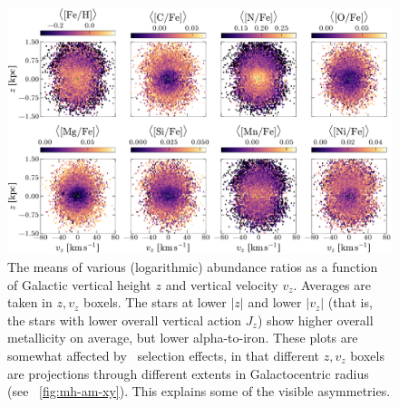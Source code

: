 \documentclass[modern]{aastex63}
\newcommand{\apogee}{\acronym{APOGEE}}
\begin{document}
\begin{figure}[!tp]
  \begin{mdframed}
  \color{captiongray}
  \begin{center}
  \includegraphics[width=\textwidth]{abundance-zvz-grid.pdf}
  \end{center}
  \caption{%
    The means of various (logarithmic) abundance ratios as a function of
    Galactic vertical height $z$ and vertical velocity $v_z$.
    Averages are taken in $z, v_z$ boxels.
    The stars at lower $|z|$ and lower $|v_z|$ (that is, the stars with
    lower overall vertical action $J_z$) show higher overall metallicity
    on average, but lower alpha-to-iron.
    These plots are somewhat affected by \apogee\ selection effects, in
    that different $z, v_z$ boxels are projections through different extents
    in Galactocentric radius (see \figurename~\ref{fig:mh-am-xy}).
    This explains some of the visible asymmetries.
  \label{fig:zvz-grid}
  }
  \end{mdframed}
\end{figure}
\end{document}
